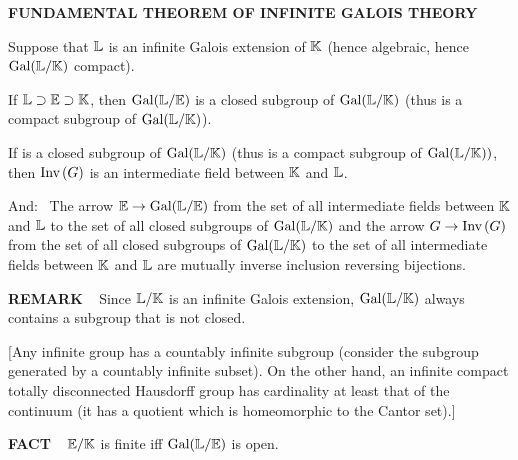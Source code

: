\begin{x}{\small\bf FUNDAMENTAL THEOREM OF INFINITE GALOIS THEORY} \ %

Suppose that $\mathbb{L}$ is an infinite Galois extension of $\mathbb{K}$ (hence algebraic, hence $\text{Gal}(\mathbb{L} / \mathbb{K})$ compact).

\vspace{0.1cm}

\qquad \textbullet \quad If $\mathbb{L} \supset \mathbb{E} \supset \mathbb{K}$, then $\text{Gal}(\mathbb{L} / \mathbb{E})$ is a closed subgroup of $\text{Gal}(\mathbb{L}/\mathbb{K})$ 
(thus is a compact subgroup of $\text{Gal}(\mathbb{L}/\mathbb{K})$).  

\vspace{0.1cm}

\qquad \textbullet \quad If \mG is a closed subgroup of $\text{Gal}(\mathbb{L}/\mathbb{K})$ (thus is a compact subgroup of $\text{Gal}(\mathbb{L}/\mathbb{K}))$, then 
$\text{Inv}\hspace{0.05cm}(G)$ is an intermediate field between $\mathbb{K}$ and $\mathbb{L}$.

\vspace{0.1cm}

And: \ The arrow $\mathbb{E} \rightarrow \text{Gal}(\mathbb{L}/\mathbb{E})$ from the set of all intermediate fields between $\mathbb{K}$ and $\mathbb{L}$  to the set of all closed  
subgroups of $\text{Gal}(\mathbb{L}/\mathbb{K})$ and the arrow $G \rightarrow \text{Inv}\hspace{0.05cm}(G)$ from the set of all closed  
subgroups of $\text{Gal}(\mathbb{L}/\mathbb{K})$ to the set of all intermediate fields between $\mathbb{K}$ and $\mathbb{L}$
are mutually inverse inclusion reversing bijections. 
\end{x}

\vspace{0.1cm}

\begin{x}{\small\bf REMARK} \ %
Since $\mathbb{L} / \mathbb{K}$ is an infinite Galois extension, $\text{Gal}(\mathbb{L} / \mathbb{K})$ always contains a subgroup that is not closed.

\vspace{0.1cm}

[Any infinite group has a countably infinite subgroup (consider the subgroup generated by a countably infinite subset).  
On the other hand, an infinite compact totally disconnected Hausdorff group has cardinality at least that of the continuum 
(it has a quotient which is homeomorphic to the Cantor set).]
\end{x}

\vspace{0.1cm}



\begin{x}{\small\bf FACT} \ %
$\mathbb{E}/\mathbb{K}$ is finite iff $\text{Gal}(\mathbb{L} / \mathbb{E})$ is open.
\end{x}

